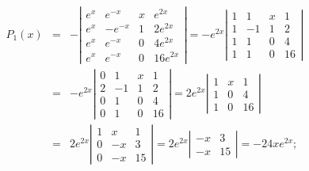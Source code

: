 \documentclass[dvips]{book}
\numberwithin{example}{section}
\numberwithin{equation}{section}
\numberwithin{theorem}{section}
\numberwithin{table}{section}
\numberwithin{figure}{section}
\begin{document}
\begin{eqnarray*}
P_1(x)&=&
-\left|\begin{array}{crcc}
e^x&e^{-x}&x&e^{2x}\\
e^x&-e^{-x}&1&2e^{2x}\\
e^x&e^{-x}&0&4e^{2x}\\
e^x&e^{-x}&0&16e^{2x}
\end{array}\right|=
-e^{2x}\left|\begin{array}{crcc}
1&1&x&1\\
1&-1&1&2\\
1&1&0&4\\
1&1&0&16
\end{array}\right|\\
&=&-e^{2x}\left|\begin{array}{crcc}
0&1&x&1\\
2&-1&1&2\\
0&1&0&4\\
0&1&0&16
\end{array}\right|
=2e^{2x}\left|\begin{array}{crcc}
1&x&1\\
1&0&4\\
1&0&16
\end{array}\right|\\
&=&2e^{2x}\left|\begin{array}{crcc}
1&x&1\\
0&-x&3\\
0&-x&15
\end{array}\right|
=2e^{2x}\left|\begin{array}{crcc}
-x&3\\
-x&15
\end{array}\right|=-24xe^{2x};
\end{eqnarray*}
\end{document}
